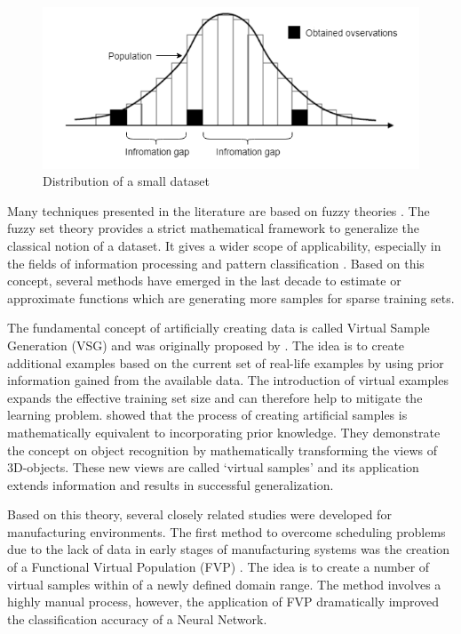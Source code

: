 \documentclass[parskip=full]{scrartcl}
\begin{document}
\begin{figure}[H]
	\centering
	\includegraphics[width=0.6\linewidth]{"./resources/small_data_distribution"}
	\caption{Distribution of a small dataset \cite{Tsai.2015}}
	\label{fig:small-data-distribution}
\end{figure}

Many techniques presented in the literature are based on fuzzy theories
\cite{AbdulLateh.2017}. The fuzzy set theory provides a strict mathematical
framework to generalize the classical notion of a dataset. It gives a wider
scope of applicability, especially in the fields of information processing and
pattern classification \cite{Zimmermann.2010}. Based on this concept, several
methods have emerged in the last decade to estimate or approximate functions
which are generating more samples for sparse training sets.

The fundamental concept of artificially creating data is called Virtual Sample 
Generation (VSG) and was originally proposed by \cite{Niyogi.1998}. The idea is 
to create additional examples based on the current set of real-life examples by 
using prior information gained from the available data. The introduction of 
virtual examples expands the effective training set size and can therefore help 
to mitigate the learning problem. \cite{Niyogi.1998} showed that the process of 
creating artificial samples is mathematically equivalent to incorporating prior 
knowledge. They demonstrate the concept on object recognition by mathematically 
transforming the views of 3D-objects. These new views are called ‘virtual 
samples’ and its application extends information and results in successful 
generalization. 

Based on this theory, several closely related studies were developed for
manufacturing environments. The first method to overcome scheduling problems due
to the lack of data in early stages of manufacturing systems was the creation of
a Functional Virtual Population (FVP) \cite{Li.2003}. The idea is to
create a number of virtual samples within of a newly defined domain range. The
method involves a highly manual process, however, the application of FVP
dramatically improved the classification accuracy of a Neural Network. 
\end{document}

